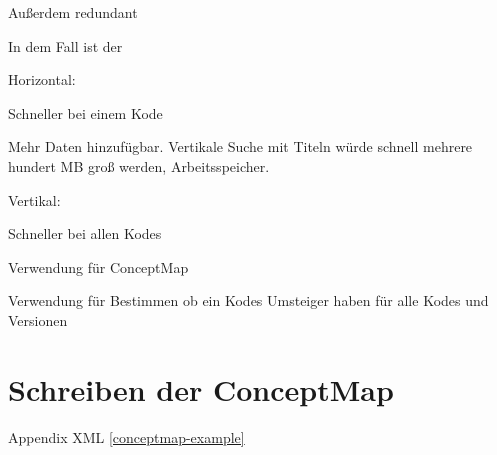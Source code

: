 Außerdem redundant

In dem Fall ist der

Horizontal:

Schneller bei einem Kode

Mehr Daten hinzufügbar. Vertikale Suche mit Titeln würde schnell mehrere hundert MB groß werden, Arbeitsspeicher.

Vertikal:

Schneller bei allen Kodes

Verwendung für ConceptMap

Verwendung für Bestimmen ob ein Kodes Umsteiger haben für alle Kodes und Versionen


\section{Schreiben der ConceptMap}

Appendix XML \ref{conceptmap-example}

